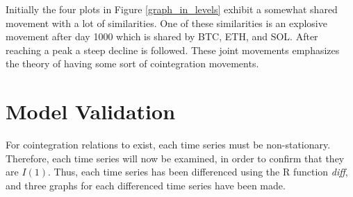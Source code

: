 \noindent Initially the four plots in Figure \ref{graph_in_levels} exhibit a somewhat shared movement with a lot of similarities. One of these similarities is an explosive movement after day 1000 which is shared by BTC, ETH, and SOL. After reaching a peak a steep decline is followed. These joint movements emphasizes the theory of having some sort of cointegration movements.\\ 


\section{Model Validation}
For cointegration relations to exist, each time series must be non-stationary. Therefore, each time series will now be examined, in order to confirm that they are $I(1)$. Thus, each time series has been differenced using the R function \textit{diff}, and three graphs for each differenced time series have been made.
